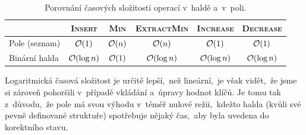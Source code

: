 \begin{table}[ht]
    \centering
    \begin{tabular}{l|ccccc}
                  & \textsc{Insert} & \textsc{Min} & \textsc{ExtractMin} & \textsc{Increase} & \textsc{Decrease} \\\hline
    Pole (seznam) & $\mathcal{O}(1)$                       & $\mathcal{O}(n)$                    & $\mathcal{O}(n)$                           & $\mathcal{O}(1)$                         & $\mathcal{O}(1)$                         \\
    Binární halda & $\mathcal{O}(\log{n})$                 & $\mathcal{O}(1)$                    & $\mathcal{O}(\log{n})$                     & $\mathcal{O}(\log{n})$                   & $\mathcal{O}(\log{n})$                  
    \end{tabular}
    \caption{Porovnání časových složitostí operací v~haldě a~v~poli.}
    \label{tab:halda_pole_operace}
\end{table}
Logaritmická časová složitost je určitě lepší,~než lineární,~je však vidět,~že jsme si zároveň pohoršili v~případě vkládání a~úpravy hodnot klíčů. Je tomu tak z~důvodu,~že pole má svou výhodu v~téměř nulové režii,~kdežto halda (kvůli své pevně definované struktuře) spotřebuje nějaký čas,~aby byla uvedena do korektního stavu.
